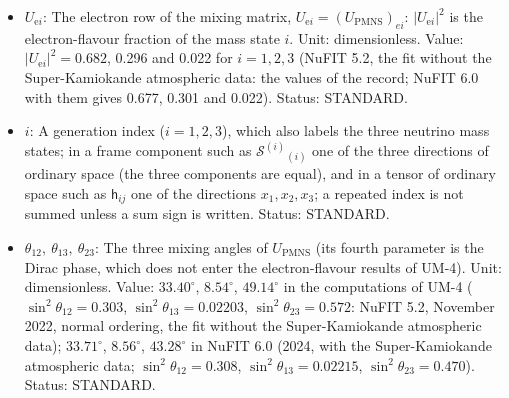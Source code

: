 \documentclass[
  10pt,
]{article}
\providecommand{\tightlist}{%
  \setlength{\itemsep}{0pt}\setlength{\parskip}{0pt}}
\begin{document}
\begin{itemize}
\tightlist
\item
  \(U_{\mathrm{e}i}\): The electron row of the mixing matrix,
  \(U_{\mathrm{e}i} = (U_{\mathrm{PMNS}})_{ei}\):
  \(\lvert U_{\mathrm{e}i}\rvert^2\) is the electron-flavour fraction of
  the mass state \(i\). Unit: dimensionless. Value:
  \(\lvert U_{\mathrm{e}i}\rvert^2 = 0.682\), 0.296 and 0.022 for
  \(i = 1, 2, 3\) (NuFIT 5.2, the fit without the Super-Kamiokande
  atmospheric data: the values of the record; NuFIT 6.0 with them gives
  0.677, 0.301 and 0.022). Status: STANDARD.
\item
  \(i\): A generation index (\(i = 1, 2, 3\)), which also labels the
  three neutrino mass states; in a frame component such as
  \(\mathcal{S}^{(i)}{}_{(i)}\) one of the three directions of ordinary
  space (the three components are equal), and in a tensor of ordinary
  space such as \(\mathsf{h}_{ij}\) one of the directions
  \(x_1, x_2, x_3\); a repeated index is not summed unless a sum sign is
  written. Status: STANDARD.
\item
  \(\theta_{12},\ \theta_{13},\ \theta_{23}\): The three mixing angles
  of \(U_{\mathrm{PMNS}}\) (its fourth parameter is the Dirac phase,
  which does not enter the electron-flavour results of UM-4). Unit:
  dimensionless. Value: \(33.40^\circ\), \(8.54^\circ\), \(49.14^\circ\)
  in the computations of UM-4 (\(\sin^2\theta_{12} = 0.303\),
  \(\sin^2\theta_{13} = 0.02203\), \(\sin^2\theta_{23} = 0.572\): NuFIT
  5.2, November 2022, normal ordering, the fit without the
  Super-Kamiokande atmospheric data); \(33.71^\circ\), \(8.56^\circ\),
  \(43.28^\circ\) in NuFIT 6.0 (2024, with the Super-Kamiokande
  atmospheric data; \(\sin^2\theta_{12} = 0.308\),
  \(\sin^2\theta_{13} = 0.02215\), \(\sin^2\theta_{23} = 0.470\)).
  Status: STANDARD.
\end{itemize}
\end{document}
